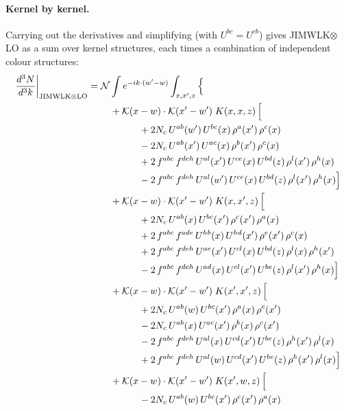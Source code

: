 \documentclass[10pt]{article}
\numberwithin{equation}{section}
\newcommand{\KK}{\mathcal K}
\newcommand{\NN}{\mathcal N}
\begin{document}
\paragraph{Kernel by kernel.} Carrying out the derivatives and simplifying (with $U^{bc}=U^{cb}$) gives JIMWLK$\otimes$LO as a sum over kernel structures, each times a combination of independent colour structures:
\begin{align}
\frac{d^3N}{d^3k}\bigg|_{\rm JIMWLK\otimes LO}={}&\NN\int e^{-ik\cdot(w'-w)}\int_{x,x',z}\Big\{\notag\\
&\quad +\KK(x-w)\cdot\KK(x'-w')\;K(x,x,z)\,\Big[\notag\\
&\qquad\qquad +2 N_c\,U^{ab}(w')\,U^{bc}(x)\,\rho^{a}(x')\,\rho^{c}(x)\notag\\
&\qquad\qquad - 2 N_c\,U^{ab}(x')\,U^{ac}(x)\,\rho^{b}(x')\,\rho^{c}(x)\notag\\
&\qquad\qquad +2\,f^{abc}\,f^{deh}\,U^{al}(x')\,U^{ce}(x)\,U^{bd}(z)\,\rho^{l}(x')\,\rho^{h}(x)\notag\\
&\qquad\qquad -2\,f^{abc}\,f^{deh}\,U^{al}(w')\,U^{ce}(x)\,U^{bd}(z)\,\rho^{l}(x')\,\rho^{h}(x)\Big]\notag\\
&\quad +\KK(x-w)\cdot\KK(x'-w')\;K(x,x',z)\,\Big[\notag\\
&\qquad\qquad +2 N_c\,U^{ab}(x)\,U^{bc}(x')\,\rho^{c}(x')\,\rho^{a}(x)\notag\\
&\qquad\qquad +2\,f^{abc}\,f^{ade}\,U^{hb}(x)\,U^{hd}(x')\,\rho^{e}(x')\,\rho^{c}(x)\notag\\
&\qquad\qquad +2\,f^{abc}\,f^{deh}\,U^{ae}(x')\,U^{cl}(x)\,U^{bd}(z)\,\rho^{l}(x)\,\rho^{h}(x')\notag\\
&\qquad\qquad -2\,f^{abc}\,f^{deh}\,U^{ad}(x)\,U^{cl}(x')\,U^{be}(z)\,\rho^{l}(x')\,\rho^{h}(x)\Big]\notag\\
&\quad +\KK(x-w)\cdot\KK(x'-w')\;K(x',x',z)\,\Big[\notag\\
&\qquad\qquad +2 N_c\,U^{ab}(w)\,U^{bc}(x')\,\rho^{a}(x)\,\rho^{c}(x')\notag\\
&\qquad\qquad - 2 N_c\,U^{ab}(x)\,U^{ac}(x')\,\rho^{b}(x)\,\rho^{c}(x')\notag\\
&\qquad\qquad -2\,f^{abc}\,f^{deh}\,U^{al}(x)\,U^{cd}(x')\,U^{be}(z)\,\rho^{h}(x')\,\rho^{l}(x)\notag\\
&\qquad\qquad +2\,f^{abc}\,f^{deh}\,U^{al}(w)\,U^{cd}(x')\,U^{be}(z)\,\rho^{h}(x')\,\rho^{l}(x)\Big]\notag\\
&\quad +\KK(x-w)\cdot\KK(x'-w')\;K(x',w,z)\,\Big[\notag\\
&\qquad\qquad - 2 N_c\,U^{ab}(w)\,U^{bc}(x')\,\rho^{c}(x')\,\rho^{a}(x)\notag\\

\end{align}
\end{document}
